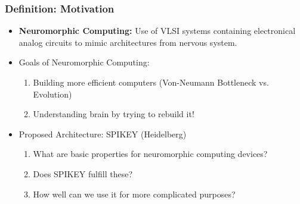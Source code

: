 \documentclass{beamer}
\begin{document}
\begin{frame}
    \frametitle{Definition: Motivation}
   	\begin{itemize}
   		\item \textbf{Neuromorphic Computing:} Use of VLSI systems containing 
   		electronical analog circuits to mimic architectures from nervous system.
   		\item Goals of Neuromorphic Computing:
   		\begin{enumerate}
   			\item Building more efficient computers (Von-Neumann Bottleneck vs.  Evolution)
   			\item  Understanding brain by trying to rebuild it!
   		\end{enumerate}
   		\bigskip
   		\item Proposed Architecture: SPIKEY (Heidelberg)
   		\begin{enumerate}
   			\item What are basic properties for neuromorphic computing devices?
   			\item Does SPIKEY fulfill these?
   			\item How well can we use it for more complicated purposes?
   		\end{enumerate}
   	\end{itemize}
\end{frame}
\end{document}
